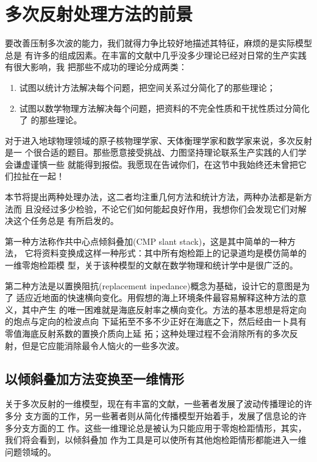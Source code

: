 \section{多次反射处理方法的前景}
\label{sec:5.6}

要改善压制多次波的能力，我们就得力争比较好地描述其特征，麻烦的是实际模型总是
有许多的组成因素。在丰富的文献中几乎没多少理论已经对日常的生产实践有很大影响，我
把那些不成功的理论分成两类：
\begin{enumerate}
\item 试图以统计方法解决每个问题，把空间关系过分简化了的那些理论；
\item 试图以数学物理方法解决每个问题，把资料的不完全性质和干扰性质过分简化了
的那些理论。
\end{enumerate}

对于进入地球物理领域的原子核物理学家、天体衡理学家和数学家来说，多次反射是一
个很合适的题目。那些愿意接受挑战、力图坚持理论联系生产实践的人们学会谦虚谨慎一些
就能得到报偿。我愿现在告诫你们，在这节中我始终还未曾把它们拉扯在一起！

本节将提出两种处理办法，这二者均注重几何方法和统计方法，两种办法都是新方法而
且没经过多少检验，不论它们如何能起良好作用，我想你们会发现它们对解决这个任务总是
有所启发的。

第一种方法称作共中心点倾斜叠加(CMP slant stack)，这是其中简单的一种方法，
它将资料变换成这样一种彤式：其中所有炮检距上的记录道均是模仿简单的一维零炮检距模
型，关于该种模型的文献在数学物理和统计学中是很广泛的。

第二种方法是以置换阻抗(replacement inpedance)概念为基础，设计它的意图是为了
适应近地面的快速横向变化。用假想的海上环境条件最容易解释这种方法的意义，其中产生
的唯一困难就是海底反射率之横向变化。方法的基本思想是将定向的炮点与定向的检波点向
下延拓至不多不少正好在海底之下，然后经由一卜具有零值海底反射系数的置换介质向上延
拓；这种处理过程不会消除所有的多次反射，但是它应能消除最令人恼火的一些多次波。

\subsection{以倾斜叠加方法变换至一维情形}
\label{sec:5.6.1}

关于多次反射的一维模型，现在有丰富的文献，一些著者发展了波动传播理论的许多分
支方面的工作，另一些著者则从简化传播模型开始着手，发展了信息论的许多分支方面的工
作。这些一维理论总是被认为只能应用于零炮检距情形，其实，我们将会看到，以倾斜叠加
作为工具是可以使所有其他炮检距情形都能进入一维问题领域的。

